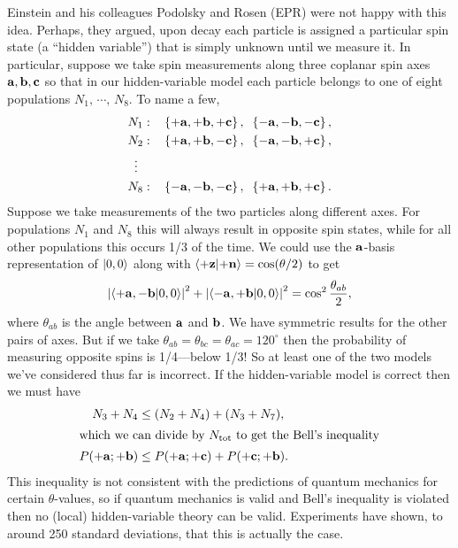 \documentclass[../p116main.tex]{subfiles}
\begin{document}
Einstein and his colleagues Podolsky and Rosen (EPR) were not happy with this idea.
Perhaps, they argued, upon decay each particle is assigned a particular spin state (a ``hidden variable'') that is simply unknown until we measure it.
In particular, suppose we take spin measurements along three coplanar spin axes $\mathbf{a},\mathbf{b},\mathbf{c}$ so that in our hidden-variable model each particle belongs to one of eight populations $N_1, \, \cdots, \, N_8$.
To name a few,  \vspace{-10pt}
\begin{align*}
    N_1: &\quad \left\{ +\mathbf{a}, +\mathbf{b}, +\mathbf{c} \right\}, \;\; \left\{ -\mathbf{a}, -\mathbf{b}, -\mathbf{c} \right\}, \\
    N_2: &\quad \left\{ +\mathbf{a}, +\mathbf{b}, -\mathbf{c} \right\}, \;\; \left\{ -\mathbf{a}, -\mathbf{b}, +\mathbf{c} \right\}, \\
    \vdots\quad \\
    N_8: &\quad \left\{ -\mathbf{a}, -\mathbf{b}, -\mathbf{c} \right\}, \;\; \left\{ +\mathbf{a}, +\mathbf{b}, +\mathbf{c} \right\}.
\end{align*}
Suppose we take measurements of the two particles along different axes.
For populations $N_1$ and $N_8$ this will always result in opposite spin states, while for all other populations this occurs 1/3 of the time.
We could use the $\mathbf{a}$-basis representation of $\left| 0,0 \right>$ along with $\left< +\mathbf{z} \middle| +\mathbf{n} \right> = \cos(\theta / 2)$ to get
\[ \left| \left< +\mathbf{a},-\mathbf{b} \middle| 0,0 \right> \right|^2 + \left| \left< -\mathbf{a},+\mathbf{b} \middle| 0,0 \right> \right|^2 = \cos^2 \frac{\theta_{ab}}{2}, \]
where $\theta_{ab}$ is the angle between $\mathbf{a}$ and $\mathbf{b}$.
We have symmetric results for the other pairs of axes.
But if we take $\theta_{ab} = \theta_{bc} = \theta_{ac} = 120^\circ$ then the probability of measuring opposite spins is 1/4---below 1/3!
So at least one of the two models we've considered thus far is incorrect.
If the hidden-variable model is correct then we must have
\begin{align*}
    N_3 + N_4 &\leq (N_2 + N_4) + (N_3 + N_7), \\
    \intertext{which we can divide by $N_\textrm{tot}$ to get the Bell's inequality}
    P(+\mathbf{a}; +\mathbf{b}) &\leq P(+\mathbf{a}; +\mathbf{c}) + P(+\mathbf{c}; +\mathbf{b}).
\end{align*}
This inequality is not consistent with the predictions of quantum mechanics for certain $\theta$-values, so if quantum mechanics is valid and Bell's inequality is violated then no (local) hidden-variable theory can be valid.
Experiments have shown, to around 250 standard deviations, that this is actually the case.
\end{document}
